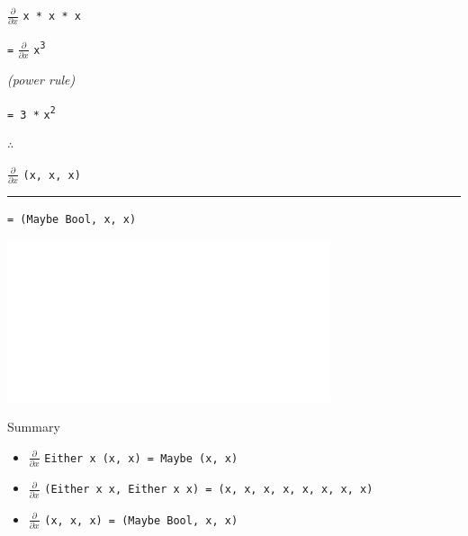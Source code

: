 \begin{frame}
\begin{center}
$\frac{\partial}{\partial x}$ \lstinline{x * x * x}

\lstinline{=} $\frac{\partial}{\partial x}$ \lstinline{x}\textsuperscript{\lstinline{3}}

\tiny{\emph{(power rule)}}\normalsize{}

\lstinline{= 3 *} \lstinline{x}\textsuperscript{\lstinline{2}}
\end{center}
\end{frame}


\begin{frame}
\begin{block}{$\therefore$}
\begin{center}
$\frac{\partial}{\partial x}$ \lstinline{(x, x, x)}

\par\noindent\rule{\textwidth}{0.4pt}

\lstinline{= (Maybe Bool, x, x)}
\end{center}
\end{block}
\end{frame}


\begin{frame}
\begin{center}
\includegraphics[width=0.3\textheight]{image/crosseyed-blank.png}
\end{center}
\begin{block}{Summary}
\begin{itemize}
  \item \scriptsize{$\frac{\partial}{\partial x}$ \lstinline{Either x (x, x) = Maybe (x, x)}}
  \item \scriptsize{$\frac{\partial}{\partial x}$ \lstinline{(Either x x, Either x x) = (x, x, x, x, x, x, x, x)}}
  \item \scriptsize{$\frac{\partial}{\partial x}$ \lstinline{(x, x, x) = (Maybe Bool, x, x)}}
\end{itemize}
\end{block}
\end{frame}


